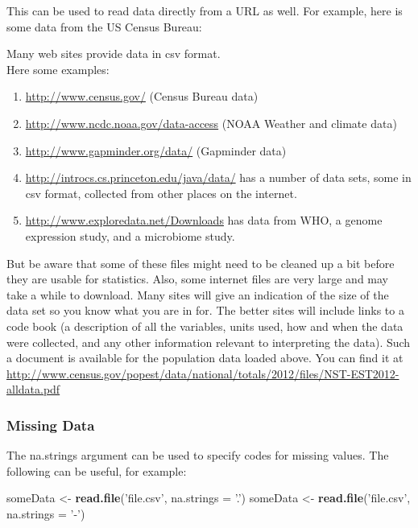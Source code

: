 \documentclass[]{book}
\newenvironment{Shaded}{\begin{snugshade}}{\end{snugshade}}
\newcommand{\DataTypeTok}[1]{\textcolor[rgb]{0.13,0.29,0.53}{#1}}
\newcommand{\KeywordTok}[1]{\textcolor[rgb]{0.13,0.29,0.53}{\textbf{#1}}}
\newcommand{\NormalTok}[1]{#1}
\newcommand{\StringTok}[1]{\textcolor[rgb]{0.31,0.60,0.02}{#1}}
\providecommand{\tightlist}{%
  \setlength{\itemsep}{0pt}\setlength{\parskip}{0pt}}
\begin{document}
This can be used to read data directly from a URL as well. For example, here is some data from the US Census Bureau:

Many web sites provide data in csv format.\\
Here some examples:

\begin{enumerate}
\tightlist
\item
  \url{http://www.census.gov/} (Census Bureau data)
\item
  \url{http://www.ncdc.noaa.gov/data-access} (NOAA Weather and climate data)
\item
  \url{http://www.gapminder.org/data/} (Gapminder data)
\item
  \url{http://introcs.cs.princeton.edu/java/data/} has a number of data sets, some in csv format, collected from other places on the internet.
\item
  \url{http://www.exploredata.net/Downloads} has data from WHO, a genome expression study, and a microbiome study.
\end{enumerate}

But be aware that some of these files might need to be cleaned up a bit before
they are usable for statistics. Also, some internet files are very large and
may take a while to download. Many sites will give an indication of the size
of the data set so you know what you are in for. The better sites will
include links to a code book (a description of all the variables, units used,
how and when the data were collected, and any other information relevant to
interpreting the data). Such a document is available for the population data
loaded above. You can find it at
\url{http://www.census.gov/popest/data/national/totals/2012/files/NST-EST2012-alldata.pdf}

\hypertarget{missing-data}{%
\subsubsection{Missing Data}\label{missing-data}}

The {na.strings} argument can be used to specify codes for missing values. The following can be useful, for example:

\begin{Shaded}
\begin{Highlighting}[]
\NormalTok{someData <-}\StringTok{ }\KeywordTok{read.file}\NormalTok{(}\StringTok{'file.csv'}\NormalTok{, }\DataTypeTok{na.strings =} \StringTok{'.'}\NormalTok{)}
\NormalTok{someData <-}\StringTok{ }\KeywordTok{read.file}\NormalTok{(}\StringTok{'file.csv'}\NormalTok{, }\DataTypeTok{na.strings =} \StringTok{'-'}\NormalTok{)}
\end{Highlighting}
\end{Shaded}
\end{document}
